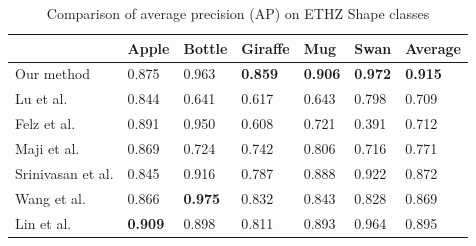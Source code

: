 \documentclass{article}
\begin{document}
\begin{table}[!t]
\renewcommand{\arraystretch}{1.3}
\caption{Comparison of average precision (AP) on ETHZ Shape classes}
\label{tab:1}
\centering
\scriptsize
\begin{tabular}{l|llllll}
\hline
& Apple & Bottle & Giraffe & Mug & Swan & Average \\
\hline
Our method              & 0.875                 & 0.963         &\textbf{0.859} &\textbf{0.906} &\textbf{0.972} &\textbf{0.915} \\
Lu et al.\cite{lu2009}  & 0.844                 & 0.641         & 0.617         & 0.643         & 0.798         & 0.709 \\
Felz et al.\cite{felzenszwalb2007} & 0.891      & 0.950         & 0.608         & 0.721         & 0.391         & 0.712 \\
Maji et al.\cite{maji2009}  & 0.869             & 0.724         & 0.742         & 0.806         & 0.716         & 0.771 \\
Srinivasan et al.\cite{srinivasan2010}  & 0.845 & 0.916         & 0.787         & 0.888         & 0.922         & 0.872 \\
Wang et al.\cite{wang2012} & 0.866              &\textbf{0.975} & 0.832         & 0.843         & 0.828         & 0.869 \\
Lin et al.\cite{lin2012}  &\textbf{0.909}       & 0.898         & 0.811         & 0.893         & 0.964         & 0.895 \\
\hline
\end{tabular}
\end{table}
\end{document}

